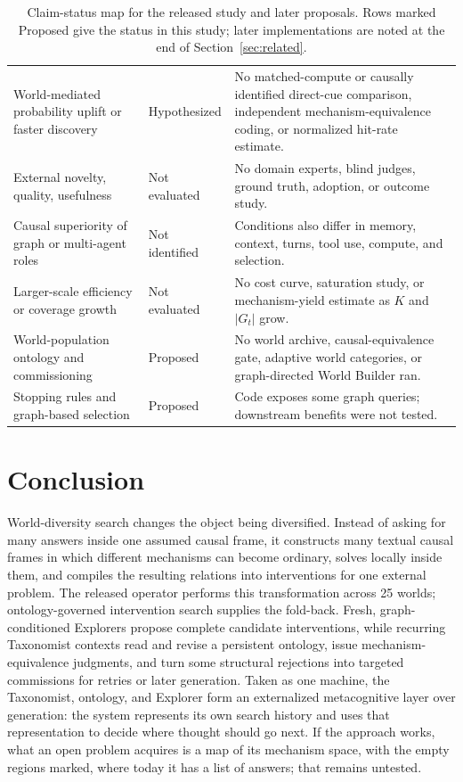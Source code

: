 \documentclass[11pt,a4paper]{article}
\begin{document}
\begin{table}[htbp]
\begin{tabularx}{\textwidth}{>{\raggedright\arraybackslash}p{39mm}>{\raggedright\arraybackslash}p{25mm}X}
World-mediated probability uplift or faster discovery & Hypothesized & No matched-compute or causally identified direct-cue comparison, independent mechanism-equivalence coding, or normalized hit-rate estimate. \\
External novelty, quality, usefulness & Not evaluated & No domain experts, blind judges, ground truth, adoption, or outcome study. \\
Causal superiority of graph or multi-agent roles & Not identified & Conditions also differ in memory, context, turns, tool use, compute, and selection. \\
Larger-scale efficiency or coverage growth & Not evaluated & No cost curve, saturation study, or mechanism-yield estimate as $K$ and $|G_t|$ grow. \\
World-population ontology and commissioning & Proposed & No world archive, causal-equivalence gate, adaptive world categories, or graph-directed World Builder ran. \\
Stopping rules and graph-based selection & Proposed & Code exposes some graph queries; downstream benefits were not tested. \\
\bottomrule
\end{tabularx}
\caption{Claim-status map for the released study and later proposals. Rows marked Proposed give the status in this study; later implementations are noted at the end of Section~\ref{sec:related}.}
\label{tab:claim-status}
\end{table}
\FloatBarrier

\section{Conclusion}

World-diversity search changes the object being diversified. Instead of asking for many answers inside one assumed causal frame, it constructs many textual causal frames in which different mechanisms can become ordinary, solves locally inside them, and compiles the resulting relations into interventions for one external problem. The released operator performs this transformation across 25 worlds; ontology-governed intervention search supplies the fold-back. Fresh, graph-conditioned Explorers propose complete candidate interventions, while recurring Taxonomist contexts read and revise a persistent ontology, issue mechanism-equivalence judgments, and turn some structural rejections into targeted commissions for retries or later generation. Taken as one machine, the Taxonomist, ontology, and Explorer form an externalized metacognitive layer over generation: the system represents its own search history and uses that representation to decide where thought should go next. If the approach works, what an open problem acquires is a map of its mechanism space, with the empty regions marked, where today it has a list of answers; that remains untested.
\end{document}
